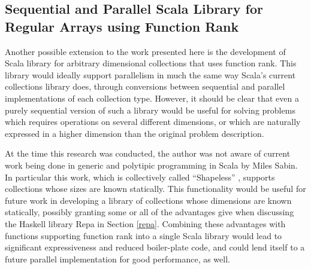 \subsection{Sequential and Parallel Scala Library for Regular Arrays using Function Rank}
Another possible extension to the work presented here 
is the development of Scala library for arbitrary dimensional collections that uses function rank. 
This library would ideally support parallelism in much the same way 
Scala's current collections library does\cite{pc},
through conversions between sequential and parallel implementations of each collection type. 
However, it should be clear that even 
a purely sequential version of such a library would be useful 
for solving problems which requires operations on several different dimensions, 
or which are naturally expressed in a higher dimension than the original problem description.

At the time this research was conducted, 
the author was not aware of current work being done in 
generic and polytipic programming in Scala by Miles Sabin. 
In particular this work, which is collectively called ``Shapeless''\cite{shapeless}
, supports collections whose sizes are known statically. 
This functionality would be useful for future work in developing 
a library of collections whose dimensions are known statically, 
possibly granting some or all of the advantages give when discussing 
the Haskell library Repa \cite{dph} in Section \ref{repa}.
Combining these advantages with functions supporting function rank into a single Scala library
would lead to significant expressiveness and reduced boiler-plate code, 
and could lend itself to a future parallel implementation for good performance, as well.
